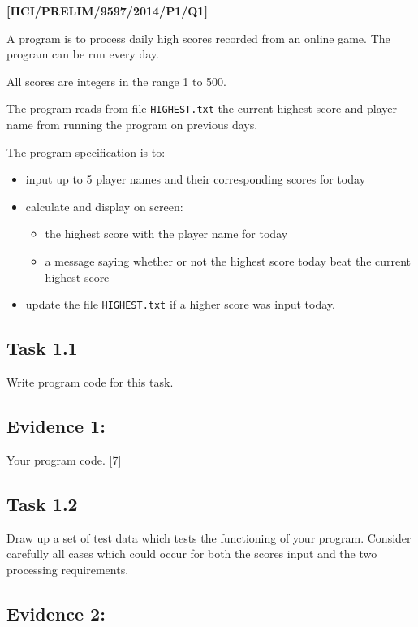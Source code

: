 \item \textbf{{[}HCI/PRELIM/9597/2014/P1/Q1{]} }

A program is to process daily high scores recorded from an online
game. The program can be run every day. 

All scores are integers in the range 1 to 500.

The program reads from file \texttt{HIGHEST.txt} the current highest
score and player name from running the program on previous days. 

The program specification is to: 
\begin{itemize}
\item input up to 5 player names and their corresponding scores for today 
\item calculate and display on screen: 
\begin{itemize}
\item the highest score with the player name for today 
\item a message saying whether or not the highest score today beat the current
highest score 
\end{itemize}
\item update the file \texttt{HIGHEST.txt} if a higher score was input today. 
\end{itemize}

\subsection*{Task 1.1 }

Write program code for this task. 

\subsection*{Evidence 1: }

Your program code. \hfill{}{[}7{]}

\subsection*{Task 1.2 }

Draw up a set of test data which tests the functioning of your program.
Consider carefully all cases which could occur for both the scores
input and the two processing requirements. 

\subsection*{Evidence 2: }

